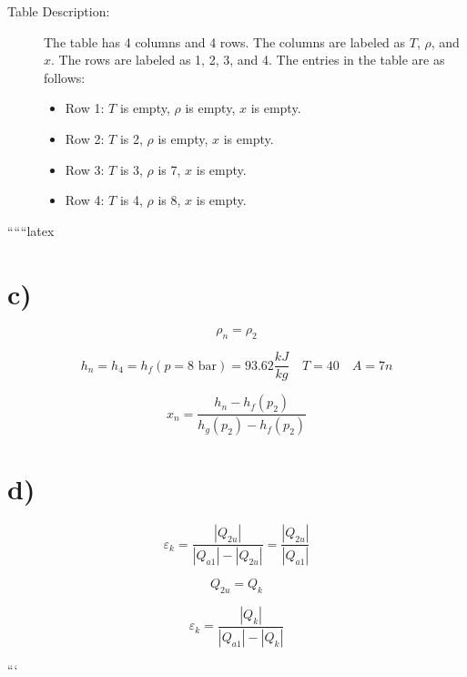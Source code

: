 \begin{description}
    \item[Table Description:] The table has 4 columns and 4 rows. The columns are labeled as $T$, $\rho$, and $x$. The rows are labeled as 1, 2, 3, and 4. The entries in the table are as follows:
    \begin{itemize}
        \item Row 1: $T$ is empty, $\rho$ is empty, $x$ is empty.
        \item Row 2: $T$ is 2, $\rho$ is empty, $x$ is empty.
        \item Row 3: $T$ is 3, $\rho$ is 7, $x$ is empty.
        \item Row 4: $T$ is 4, $\rho$ is 8, $x$ is empty.
    \end{itemize}
\end{description}

``````latex

\section*{c)}

\[
\rho_n = \rho_2
\]

\[
h_n = h_4 = h_f(p = 8 \text{ bar}) = 93.62 \frac{kJ}{kg} \quad T = 40 \quad A = 7n
\]

\[
x_n = \frac{h_n - h_f(p_2)}{h_g(p_2) - h_f(p_2)}
\]

\section*{d)}

\[
\varepsilon_k = \frac{|Q_{2u}|}{|Q_{a1}| - |Q_{2u}|} = \frac{|Q_{2u}|}{|Q_{a1}|}
\]

\[
Q_{2u} = Q_k
\]

\[
\varepsilon_k = \frac{|Q_k|}{|Q_{a1}| - |Q_k|}
\]

```
